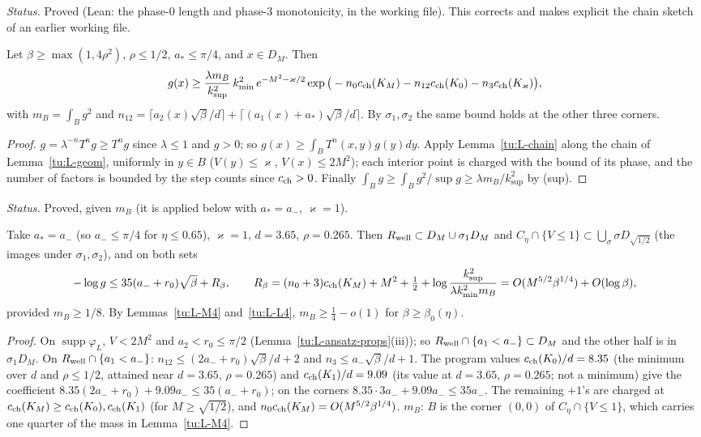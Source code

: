 \noindent\emph{Status.} Proved (Lean: the phase-0 length and phase-3 monotonicity, in the working file). This corrects
and makes explicit the chain sketch of an earlier working file.

\begin{theorem}[H4]\label{tu:L-H4}
Let $\beta\ge\max(1,4\rho^2)$, $\rho\le1/2$, $a_*\le\pi/4$, and $x\in D_M$. Then
\[
g(x)\ge\frac{\lambda m_B}{k_{\sup}^2}\,k_{\min}^2\,e^{-M^2-\varkappa/2}\exp\big(-n_0c_{\rm ch}(K_M)-n_{12}c_{\rm ch}(K_0)-n_3c_{\rm ch}(K_\varkappa)\big),
\]
with $m_B=\int_Bg^2$ and $n_{12}=\lceil a_2(x)\sqrt\beta/d\rceil+\lceil(a_1(x)+a_*)\sqrt\beta/d\rceil$. By $\sigma_1,\sigma_2$ the same
bound holds at the other three corners.
\end{theorem}

\begin{proof}
$g=\lambda^{-n}T^ng\ge T^ng$ since $\lambda\le1$ and $g>0$; so $g(x)\ge\int_BT^n(x,y)g(y)dy$. Apply Lemma~\ref{tu:L-chain}
along the chain of Lemma~\ref{tu:L-geom}, uniformly in $y\in B$ ($V(y)\le\varkappa$, $V(x)\le2M^2$); each interior point is
charged with the bound of its phase, and the number of factors is bounded by the step counts since $c_{\rm ch}>0$. Finally
$\int_Bg\ge\int_Bg^2/\sup g\ge\lambda m_B/k_{\sup}^2$ by (sup).
\end{proof}

\noindent\emph{Status.} Proved, given $m_B$ (it is applied below with $a_*=a_-$, $\varkappa=1$).

\begin{corollary}\label{tu:L-H4cor}
Take $a_*=a_-$ (so $a_-\le\pi/4$ for $\eta\le0.65$), $\varkappa=1$, $d=3.65$, $\rho=0.265$. Then
$R_{\rm well}\subset D_M\cup\sigma_1D_M$ and $C_\eta\cap\{V\le1\}\subset\bigcup_{\sigma}\sigma D_{\sqrt{1/2}}$ (the images under
$\sigma_1,\sigma_2$), and on both sets
\[
-\log g\le35(a_-+r_0)\sqrt\beta+R_\beta,\qquad R_\beta=(n_0+3)c_{\rm ch}(K_M)+M^2+\tfrac12+\log\frac{k_{\sup}^2}{\lambda k_{\min}^2m_B}
=O(M^{5/2}\beta^{1/4})+O(\log\beta),
\]
provided $m_B\ge1/8$. By Lemmas~\ref{tu:L-M4} and~\ref{tu:L-L4}, $m_B\ge\frac14-o(1)$ for $\beta\ge\beta_0(\eta)$.
\end{corollary}

\begin{proof}
On $\operatorname{supp}\varphi_L$, $V<2M^2$ and $a_2<r_0\le\pi/2$ (Lemma~\ref{tu:L-ansatz-props}(iii)); so
$R_{\rm well}\cap\{a_1<a_-\}\subset D_M$ and the other half is in $\sigma_1D_M$. On $R_{\rm well}\cap\{a_1<a_-\}$:
$n_{12}\le(2a_-+r_0)\sqrt\beta/d+2$ and $n_3\le a_-\sqrt\beta/d+1$. The program values $c_{\rm ch}(K_0)/d=8.35$ (the minimum over
$d$ and $\rho\le1/2$, attained near $d=3.65$, $\rho=0.265$) and $c_{\rm ch}(K_1)/d=9.09$ (its value at $d=3.65$, $\rho=0.265$; not a minimum) give the coefficient
$8.35(2a_-+r_0)+9.09a_-\le35(a_-+r_0)$; on the corners $8.35\cdot3a_-+9.09a_-\le35a_-$. The remaining $+1$'s are charged at
$c_{\rm ch}(K_M)\ge c_{\rm ch}(K_0),c_{\rm ch}(K_1)$ (for $M\ge\sqrt{1/2}$), and $n_0c_{\rm ch}(K_M)=O(M^{5/2}\beta^{1/4})$. $m_B$: $B$ is the corner
$(0,0)$ of $C_\eta\cap\{V\le1\}$, which carries one quarter of the mass in Lemma~\ref{tu:L-M4}.
\end{proof}


